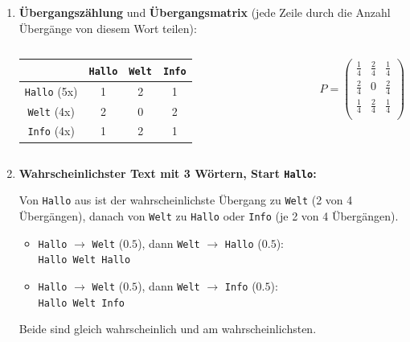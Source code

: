 \begin{frame}
    \footnotesize
    \begin{enumerate}
        \item \textbf{Übergangszählung} und \textbf{Übergangsmatrix} (jede Zeile durch die Anzahl Übergänge von diesem Wort teilen):
              \begin{columns}
                  \begin{tabular}{cccc}
                                          & \texttt{Hallo} & \texttt{Welt} & \texttt{Info} \\
                      \midrule
                      \texttt{Hallo} (5x) & 1              & 2             & 1             \\
                      \texttt{Welt} (4x)  & 2              & 0             & 2             \\
                      \texttt{Info} (4x)  & 1              & 2             & 1             \\
                  \end{tabular}
                  \[
                      P = \begin{pmatrix}
                          \frac{1}{4} & \frac{2}{4} & \frac{1}{4} \\
                          \frac{2}{4} & 0           & \frac{2}{4} \\
                          \frac{1}{4} & \frac{2}{4} & \frac{1}{4} \\
                      \end{pmatrix}
                  \]
              \end{columns}

        \item \textbf{Wahrscheinlichster Text mit 3 Wörtern, Start \texttt{Hallo}:}

              Von \texttt{Hallo} aus ist der wahrscheinlichste Übergang zu \texttt{Welt} (2 von 4 Übergängen), danach von \texttt{Welt} zu \texttt{Hallo} oder \texttt{Info} (je 2 von 4 Übergängen).

              \begin{itemize}
                  \item \texttt{Hallo} $\rightarrow$ \texttt{Welt} ($0.5$), dann \texttt{Welt} $\rightarrow$ \texttt{Hallo} ($0.5$):\\
                        \texttt{Hallo Welt Hallo}
                  \item \texttt{Hallo} $\rightarrow$ \texttt{Welt} ($0.5$), dann \texttt{Welt} $\rightarrow$ \texttt{Info} ($0.5$):\\
                        \texttt{Hallo Welt Info}
              \end{itemize}

              Beide sind gleich wahrscheinlich und am wahrscheinlichsten.
    \end{enumerate}
\end{frame}

